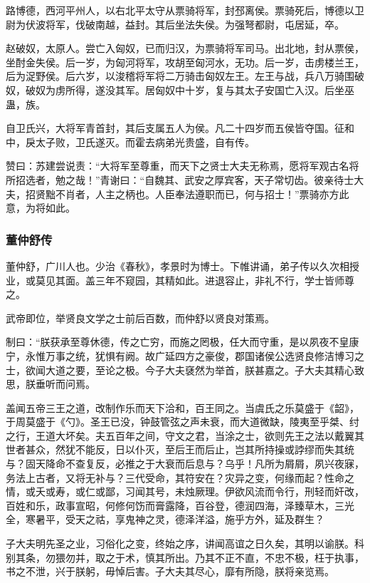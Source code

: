 \documentclass[]{article}
\begin{document}
路博德，西河平州人，以右北平太守从票骑将军，封邳离侯。票骑死后，博德以卫尉为伏波将军，伐破南越，益封。其后坐法失侯。为强弩都尉，屯居延，卒。

赵破奴，太原人。尝亡入匈奴，已而归汉，为票骑将军司马。出北地，封从票侯，坐酎金失侯。后一岁，为匈河将军，攻胡至匈河水，无功。后一岁，击虏楼兰王，后为浞野侯。后六岁，以浚稽将军将二万骑击匈奴左王。左王与战，兵八万骑围破奴，破奴为虏所得，遂没其军。居匈奴中十岁，复与其太子安国亡入汉。后坐巫蛊，族。

自卫氏兴，大将军青首封，其后支属五人为侯。凡二十四岁而五侯皆夺国。征和中，戾太子败，卫氏遂灭。而霍去病弟光贵盛，自有传。

赞曰：苏建尝说责：``大将军至尊重，而天下之贤士大夫无称焉，愿将军观古名将所招选者，勉之哉！''青谢曰：``自魏其、武安之厚宾客，天子常切齿。彼亲待士大夫，招贤黜不肖者，人主之柄也。人臣奉法遵职而已，何与招士！''票骑亦方此意，为将如此。

\hypertarget{header-n4493}{%
\subsubsection{董仲舒传}\label{header-n4493}}

董仲舒，广川人也。少治《春秋》，孝景时为博士。下帷讲诵，弟子传以久次相授业，或莫见其面。盖三年不窥园，其精如此。进退容止，非礼不行，学士皆师尊之。

武帝即位，举贤良文学之士前后百数，而仲舒以贤良对策焉。

制曰：``朕获承至尊休德，传之亡穷，而施之罔极，任大而守重，是以夙夜不皇康宁，永惟万事之统，犹惧有阙。故广延四方之豪俊，郡国诸侯公选贤良修洁博习之士，欲闻大道之要，至论之极。今子大夫褎然为举首，朕甚嘉之。子大夫其精心致思，朕垂听而问焉。

盖闻五帝三王之道，改制作乐而天下洽和，百王同之。当虞氏之乐莫盛于《韶》，于周莫盛于《勺》。圣王已没，钟鼓管弦之声未衰，而大道微缺，陵夷至乎桀、纣之行，王道大坏矣。夫五百年之间，守文之君，当涂之士，欲则先王之法以戴翼其世者甚众，然犹不能反，日以仆灭，至后王而后止，岂其所持操或誖缪而失其统与？固天降命不查复反，必推之于大衰而后息与？乌乎！凡所为屑屑，夙兴夜寐，务法上古者，又将无补与？三代受命，其符安在？灾异之变，何缘而起？性命之情，或夭或寿，或仁或鄙，习闻其号，未烛厥理。伊欲风流而令行，刑轻而奸改，百姓和乐，政事宣昭，何修何饬而膏露降，百谷登，德润四海，泽臻草木，三光全，寒暑平，受天之祜，享鬼神之灵，德泽洋溢，施乎方外，延及群生？

子大夫明先圣之业，习俗化之变，终始之序，讲闻高谊之日久矣，其明以谕朕。科别其条，勿猥勿并，取之于术，慎其所出。乃其不正不直，不忠不极，枉于执事，书之不泄，兴于朕躬，毋悼后害。子大夫其尽心，靡有所隐，朕将亲览焉。
\end{document}
